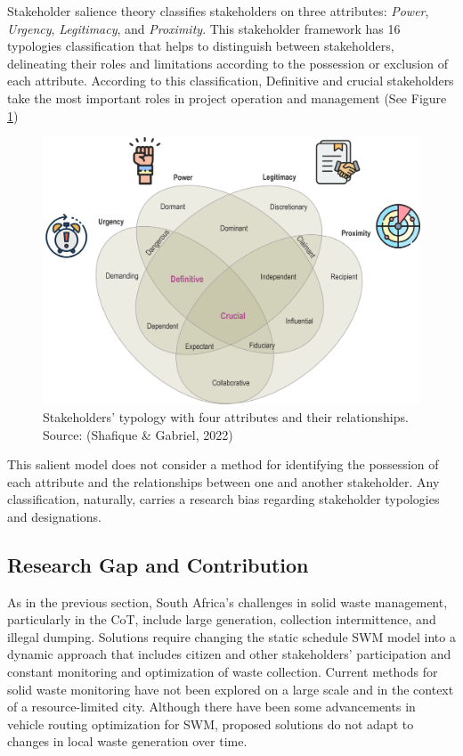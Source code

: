 \documentclass[authoryear,preprint,review,doubleblind, 12pt]{elsarticle}
\begin{document}
     Stakeholder salience theory \citep{Mitchell1997, Shafique2022} classifies stakeholders on three attributes: \textit{Power}, \textit{Urgency},  \textit{Legitimacy}, and \textit{Proximity}. This stakeholder framework has 16 typologies classification that helps to distinguish between stakeholders, delineating their roles and limitations according to the possession or exclusion of each attribute. According to this classification, Definitive and crucial stakeholders take the most important roles in project operation and management (See Figure \ref{fig:figure2})
    
    \begin{figure}[!h]
        \centering
        \includegraphics[width=0.8\columnwidth]{Figures/Shafique Stakeholders.png}
        \caption{Stakeholders' typology with four attributes and their relationships. Source: (Shafique \& Gabriel, 2022)}
        \label{fig:figure2}
    \end{figure}
    
    This salient model does not consider a method for identifying the possession of each attribute and the relationships between one and another stakeholder. Any classification, naturally, carries a research bias regarding stakeholder typologies and designations.

\subsection{Research Gap and Contribution}

As in the previous section, South Africa’s challenges in solid waste management, particularly in the CoT, include large generation, collection intermittence, and illegal dumping. Solutions require changing the static schedule SWM model into a dynamic approach that includes citizen and other stakeholders' participation and constant monitoring and optimization of waste collection. Current methods for solid waste monitoring have not been explored on a large scale and in the context of a resource-limited city. Although there have been some advancements in vehicle routing optimization for SWM, proposed solutions do not adapt to changes in local waste generation over time.
\end{document}
